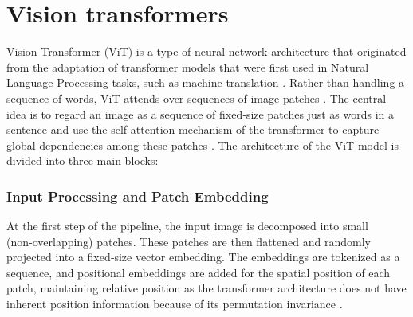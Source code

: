 \documentclass{svjour3}
\begin{document}
\section{Vision transformers}
Vision Transformer (ViT) is a type of neural network architecture that originated from the adaptation of transformer models that were first used in Natural Language Processing tasks, such as machine translation \cite{ref91}. Rather than handling a sequence of words, ViT attends over sequences of image patches \cite{ref92}. The central idea is to regard an image as a sequence of fixed‑size patches just as words in a sentence and use the self‑attention mechanism of the transformer to capture global dependencies among these patches \cite{ref93}. The architecture of the ViT model is divided into three main blocks:
\subsubsection{Input Processing and Patch Embedding}
At the first step of the pipeline, the input image is decomposed into small (non‑overlapping) patches. These patches are then flattened and randomly projected into a fixed‑size vector embedding. The embeddings are tokenized as a sequence, and positional embeddings are added for the spatial position of each patch, maintaining relative position as the transformer architecture does not have inherent position information because of its permutation invariance \cite{ref94}.
\end{document}
